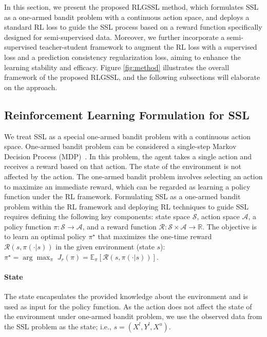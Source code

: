 In this section, we present the proposed RLGSSL method, which formulates SSL 
as a one-armed bandit problem with a continuous action space,
and deploys a standard RL loss to guide the SSL process 
based on a reward function specifically designed for semi-supervised data. 
Moreover, we further incorporate a semi-supervised teacher-student framework
to augment the RL loss with a supervised loss and a prediction consistency regularization loss, 
aiming to enhance the learning stability and efficacy. 
Figure \ref{fig:method} illustrates 
the overall framework of the proposed RLGSSL,
and the following subsections will elaborate on the approach. 

\subsection{Reinforcement Learning Formulation for SSL}
\label{sec:RLGSSL}

We treat SSL as a special one-armed bandit problem with a continuous action space. 
One-armed bandit problem can be considered a single-step Markov Decision Process (MDP)~\citep{mortazavi2022theta}. 
In this problem, the agent takes a single action and receives a reward based on that action. 
The state of the environment is not affected by the action. 
The one-armed bandit problem involves selecting an action to maximize an immediate reward,
which can be regarded as learning a policy function under the RL framework. 
Formulating SSL as a one-armed bandit problem within the RL framework
and deploying RL techniques to guide SSL
requires defining the following key components: state space $\mathcal{S}$, 
action space $\mathcal{A}$, 
a policy function $\pi: \mathcal{S} \to \mathcal{A}$, and  
a reward function $\mathcal{R}: \mathcal{S}\times \mathcal{A}\to \mathbb{R}$.
The objective is to learn an optimal policy $\pi^\star$ 
that maximizes the one-time reward $\mathcal{R}(s, \pi(\cdot|s))$ 
in the given environment (state $s$): 
$\pi^\star=\arg\max_\pi\; J_r(\pi)=\mathbb{E}_{\pi}[\mathcal{R}(s,\pi(\cdot|s))]$.

\paragraph{State}
The state encapsulates the provided knowledge about the environment and is used as input for the policy function.
As the action does not affect the state of the environment under one-armed bandit problem, 
we use the observed data from the SSL problem as the state; i.e., $s=(X^l, Y^l, X^u)$. 

